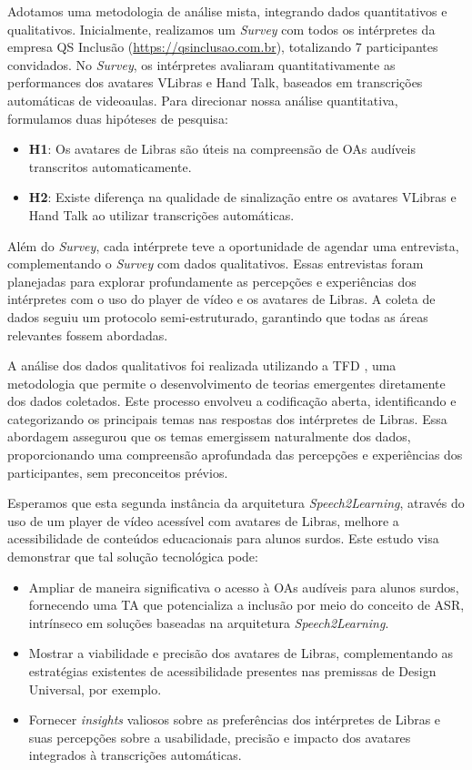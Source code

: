 Adotamos uma metodologia de análise mista, integrando dados quantitativos e qualitativos. Inicialmente, realizamos um \textit{Survey} com todos os intérpretes da empresa QS Inclusão (\url{https://qsinclusao.com.br}), totalizando 7 participantes convidados. No \textit{Survey}, os intérpretes avaliaram quantitativamente as performances dos avatares VLibras e Hand Talk, baseados em transcrições automáticas de videoaulas. Para direcionar nossa análise quantitativa, formulamos duas hipóteses de pesquisa:

\begin{itemize}
\item \textbf{H1}: Os avatares de Libras são úteis na compreensão de OAs audíveis transcritos automaticamente.
\item \textbf{H2}: Existe diferença na qualidade de sinalização entre os avatares VLibras e Hand Talk ao utilizar transcrições automáticas.
\end{itemize}

Além do \textit{Survey}, cada intérprete teve a oportunidade de agendar uma entrevista, complementando o \textit{Survey} com dados qualitativos. Essas entrevistas foram planejadas para explorar profundamente as percepções e experiências dos intérpretes com o uso do player de vídeo e os avatares de Libras. A coleta de dados seguiu um protocolo semi-estruturado, garantindo que todas as áreas relevantes fossem abordadas.

A análise dos dados qualitativos foi realizada utilizando a TFD \cite{Charmaz2009}, uma metodologia que permite o desenvolvimento de teorias emergentes diretamente dos dados coletados. Este processo envolveu a codificação aberta, identificando e categorizando os principais temas nas respostas dos intérpretes de Libras. Essa abordagem assegurou que os temas emergissem naturalmente dos dados, proporcionando uma compreensão aprofundada das percepções e experiências dos participantes, sem preconceitos prévios.

Esperamos que esta segunda instância da arquitetura \textit{Speech2Learning}, através do uso de um player de vídeo acessível com avatares de Libras, melhore a acessibilidade de conteúdos educacionais para alunos surdos. Este estudo visa demonstrar que tal solução tecnológica pode:

\begin{itemize}
    \item Ampliar de maneira significativa o acesso à OAs audíveis para alunos surdos, fornecendo uma TA que potencializa a inclusão por meio do conceito de ASR, intrínseco em soluções baseadas na arquitetura \textit{Speech2Learning}.
    \item Mostrar a viabilidade e precisão dos avatares de Libras, complementando as estratégias existentes de acessibilidade presentes nas premissas de Design Universal, por exemplo.
    \item Fornecer \textit{insights} valiosos sobre as preferências dos intérpretes de Libras e suas percepções sobre a usabilidade, precisão e impacto dos avatares integrados à transcrições automáticas.
\end{itemize}

